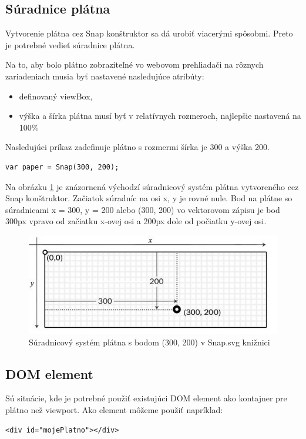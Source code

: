 \subsection{Súradnice plátna}
Vytvorenie plátna cez Snap konštruktor sa dá urobiť viacerými spôsobmi. Preto je potrebné vedieť súradnice plátna.  

Na to, aby bolo plátno zobraziteľné vo webovom prehliadači na rôznych zariadeniach musia byť nastavené nasledujúce atribúty: 
 \begin{itemize}
 	\item definovaný viewBox,
 	\item výška a šírka plátna musí byť v relatívnych rozmeroch, najlepšie nastavená na 100\%
 \end{itemize}

Nasledujúci príkaz zadefinuje plátno s rozmermi šírka je 300 a výška 200. 
\begin{lstlisting}
var paper = Snap(300, 200);
\end{lstlisting}

Na obrázku \ref{fig:suradnice1}  je znázornená východzí súradnicový systém plátna vytvoreného cez Snap konštruktor. 
Začiatok súradníc na osi x, y je rovné nule. Bod na plátne so súradnicami x = 300, y = 200 alebo (300, 200) vo vektorovom zápisu je bod 300px vpravo od začiatku x-ovej osi a 200px dole od počiatku y-ovej osi. 

\begin{center}
	\begin{figure}[H]
		\centering
		\includegraphics[width=0.5\linewidth]{obrazky/suradnice1}
		\caption{Súradnicový systém plátna s bodom (300, 200) v Snap.svg knižnici}
		\label{fig:suradnice1}
	\end{figure}
\end{center}

\subsection{DOM element}
Sú situácie, kde je potrebné použiť existujúci DOM element ako kontajner pre plátno než viewport. Ako element môžeme použiť napríklad:
\begin{lstlisting}
<div id="mojePlatno"></div>  
\end{lstlisting}

